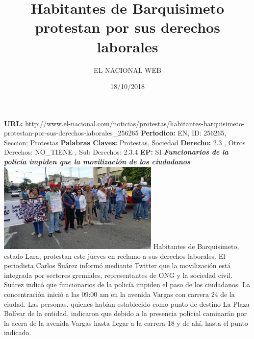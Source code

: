 \documentclass{article}%
\title{\textbf{Habitantes de Barquisimeto protestan por sus derechos laborales}}%
\author{EL NACIONAL WEB}%
\date{18/10/2018}%
\begin{document}
%
\normalsize%
\maketitle%
\textbf{URL: }%
http://www.el{-}nacional.com/noticias/protestas/habitantes{-}barquisimeto{-}protestan{-}por{-}sus{-}derechos{-}laborales\_256265\newline%
%
\textbf{Periodico: }%
EN, %
ID: %
256265, %
Seccion: %
Protestas\newline%
%
\textbf{Palabras Claves: }%
Protestas, Sociedad\newline%
%
\textbf{Derecho: }%
2.3%
, Otros Derechos: %
NO\_TIENE%
, Sub Derechos: %
2.3.4%
\newline%
%
\textbf{EP: }%
SI\newline%
\newline%
%
\textbf{\textit{Funcionarios de la policía impiden que la movilización de los ciudadanos}}%
\newline%
\newline%
%
\includegraphics[width=300px]{46.jpg}%
\newline%
%
Habitantes de Barquisimeto, estado Lara, protestan este jueves en reclamo a sus derechos laborales.%
\newline%
%
El periodista Carlos Suárez informó mediante Twitter que la movilización está integrada por sectores gremiales, representantes de ONG y la sociedad civil.%
\newline%
%
Suárez indicó que funcionarios de la policía impiden el paso de los ciudadanos.%
\newline%
%
La concentración inició a las 09:00 am en la avenida Vargas con carrera 24 de la ciudad.%
\newline%
%
Las personas, quienes habían establecido como punto de destino La Plaza Bolívar de la entidad, indicaron que debido a la presencia policial caminarán por la acera de la avenida Vargas hasta llegar a la carrera 18 y de ahí, hasta el punto indicado.%
\newline%
%
\end{document}
